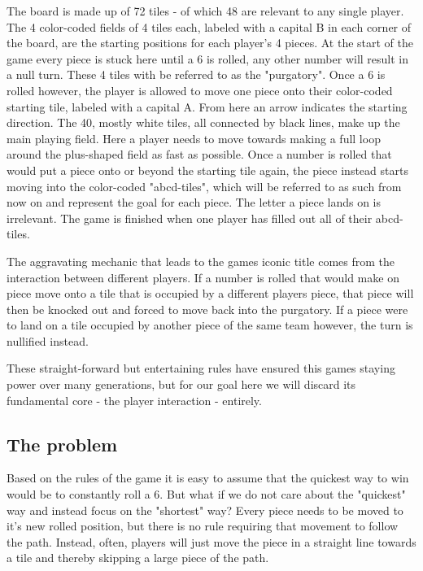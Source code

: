 \documentclass[12pt]{article} %
\begin{document}
The board is made up of 72 tiles - of which 48 are relevant to any single player.
The 4 color-coded fields of 4 tiles each, labeled with a capital B in each corner of the board, are the starting positions for
each player's 4 pieces. At the start of the game every piece is stuck here until a 6 is rolled, any other number will result in a null turn. These 4 tiles with be referred to as the "purgatory". Once a 6 is rolled however, the player is allowed to move one piece onto their color-coded starting tile, labeled with a capital A. From here an arrow indicates the starting direction. 
The 40, mostly white tiles, all connected by black lines, make up the main playing field.
Here a player needs to move towards making a full loop around the plus-shaped field as fast as possible.
Once a number is rolled that would put a piece onto or beyond the starting tile again, the piece instead starts moving into
the color-coded "abcd-tiles", which will be referred to as such from now on and represent the goal for each piece.
The letter a piece lands on is irrelevant. The game is finished when one player has filled out all of their abcd-tiles.

The aggravating mechanic that leads to the games iconic title comes from the interaction between different players. If a number is rolled that would make on piece move onto a tile that is occupied by a different
players piece, that piece will then be knocked out and forced to move back into the purgatory.
If a piece were to land on a tile occupied by another piece of the same team however, the turn is nullified instead.

These straight-forward but entertaining rules have ensured this games staying power over many generations, but for
our goal here we will discard its fundamental core - the player interaction - entirely.



\subsection{The problem}
Based on the rules of the game it is easy to assume that the quickest way to win would be to constantly roll a 6.
But what if we do not care about the "quickest" way and instead focus on the "shortest" way?
Every piece needs to be moved to it's new rolled position, but there is no rule requiring that movement to follow the path.
Instead, often, players will just move the piece in a straight line towards a tile and thereby skipping a large piece of the path. 
\end{document}
